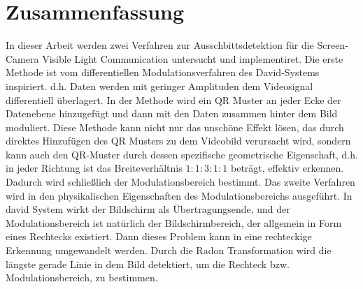 \chapter{Zusammenfassung} \label{cha:Zusammenfassung}

In dieser Arbeit werden zwei Verfahren zur Ausschbittsdetektion für die Screen-Camera Visible Light Communication untersucht und implementiret. Die erste Methode ist vom differentiellen Modulationsverfahren des David-Systems inspiriert. d.h. Daten werden mit geringer Amplituden dem Videosignal differentiell überlagert. In der Methode wird ein QR Muster an jeder Ecke der Datenebene hinzugefügt und dann mit den Daten zusammen hinter dem Bild moduliert. Diese Methode kann nicht nur das unschöne Effekt lösen, das durch direktes Hinzufügen des QR Musters zu dem Videobild verursacht wird, sondern kann auch den QR-Muster durch dessen spezifische geometrische Eigenschaft, d.h. in jeder Richtung ist das Breiteverhältnis $1:1:3:1:1$ beträgt, effektiv erkennen. Dadurch wird schließlich der Modulationsbereich bestimmt. Das zweite Verfahren wird in den physikalischen Eigenschaften des Modulationsbereichs ausgeführt. In \gls{david} System wirkt der Bildschirm als Übertragungsende, und der Modulationsbereich ist natürlich der Bildschirmbereich, der allgemein in Form eines Rechtecks existiert. Dann dieses Problem kann in eine rechteckige Erkennung umgewandelt werden. Durch die Radon Transformation wird die längste gerade Linie in dem Bild detektiert, um die Rechteck bzw. Modulationsbereich, zu bestimmen.

